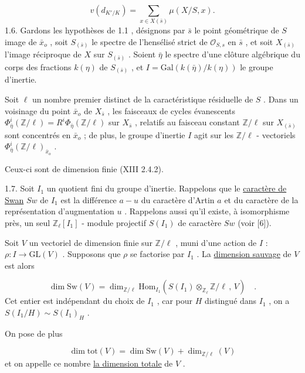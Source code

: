 \begin{equation}\tag{1.5.2}
v(d_{K'/K}) = \sum_{x \in X(\bar{s})} \mu(X/S,x).
\end{equation}
1.6. Gardons les hypothèses de 1.1 , désignons par $\bar{s}$ le point géométrique de $S$ image de $\bar{x}_o$ , soit $S_{(\bar{s})}$ le spectre de l'hensélisé strict de $\mathcal{O}_{S,s}$ en $\bar{s}$ , et soit $X_{(\bar{s})}$ l'image réciproque de $X$ sur $S_{(\bar{s})}$ . Soient $\bar{\eta}$ le spectre d'une clôture algébrique du corps des fractions $k(\eta)$ de $S_{(\bar{s})}$ , et $I = \mathrm{Gal}(k(\bar{\eta})/k(\eta))$ le groupe d'inertie.

Soit $\ell$ un nombre premier distinct de la caractéristique résiduelle de $S$ . Dans un voisinage du point $\bar{x}_o$ de $X_{\bar{s}}$ , les faisceaux de cycles évanescents $\Phi^i_{\bar{\eta}}(\mathbb{Z}/\ell) = R^i\Phi_{\bar{\eta}}(\mathbb{Z}/\ell)$ sur $X_{\bar{s}}$ , relatifs au faisceau constant $\mathbb{Z}/\ell$ sur $X_{(\bar{s})}$ sont concentrés en $\bar{x}_o$ ; de plus, le groupe d'inertie $I$ agit sur les $\mathbb{Z}/\ell$ - vectoriels $\Phi^i_{\bar{\eta}}(\mathbb{Z}/\ell)_{\bar{x}_o}$ .

Ceux-ci sont de dimension finie (XIII 2.4.2).

1.7. Soit $I_1$ un quotient fini du groupe d'inertie. Rappelons que le \underline{caractère de Swan} $Sw$ de $I_1$ est la différence $a - u$ du caractère d'Artin $a$ et du caractère de la représentation d'augmentation $u$ . Rappelons aussi qu'il existe, à isomorphisme près, un seul $\mathbb{Z}_\ell[I_1]$ - module projectif $S(I_1)$ de caractère $Sw$ (voir [6]).



Soit $V$ un vectoriel de dimension finie sur $\mathbb{Z}/\ell$ , muni d'une action de $I$ : $\rho : I \to \mathrm{GL}(V)$ . Supposons que $\rho$ se factorise par $I_1$ . La \underline{dimension sauvage} de $V$ est alors

\begin{equation}\tag{1.7.1}
\dim \mathrm{Sw}(V) = \dim_{\mathbb{Z}/\ell} \mathrm{Hom}_{I_1}(S(I_1) \otimes_{\mathbb{Z}_\ell} \mathbb{Z}/\ell \, , \, V) \quad .
\end{equation}
Cet entier est indépendant du choix de $I_1$ , car pour $H$ distingué dans $I_1$ , on a $S(I_1/H) \sim S(I_1)_H$ .

On pose de plus

\begin{equation*}
\dim \mathrm{tot}(V) = \dim \mathrm{Sw}(V) + \dim_{\mathbb{Z}/\ell}(V)
\end{equation*}
et on appelle ce nombre \underline{la dimension totale} de $V$ .

